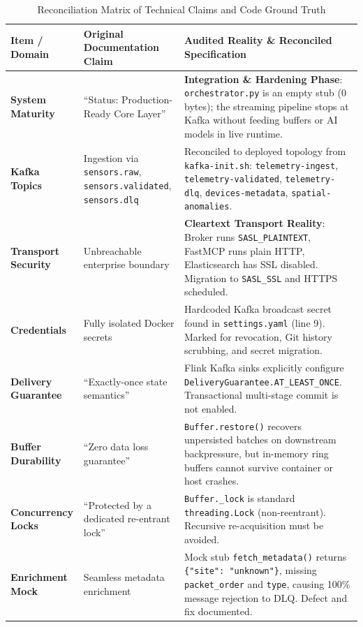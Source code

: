 \documentclass[10pt,a4paper]{report}
\begin{document}
\begin{table}[htbp]
\centering
\small
\caption{Reconciliation Matrix of Technical Claims and Code Ground Truth}
\label{tab:reconciliation_matrix}
\begin{tabularx}{\textwidth}{lXp{6.5cm}}
\toprule
\textbf{Item / Domain} & \textbf{Original Documentation Claim} & \textbf{Audited Reality \& Reconciled Specification} \\
\midrule
\textbf{System Maturity} & ``Status: Production-Ready Core Layer'' & \textbf{Integration \& Hardening Phase}: \texttt{orchestrator.py} is an empty stub (0 bytes); the streaming pipeline stops at Kafka without feeding buffers or AI models in live runtime. \\
\textbf{Kafka Topics} & Ingestion via \texttt{sensors.raw}, \texttt{sensors.validated}, \texttt{sensors.dlq} & Reconciled to deployed topology from \texttt{kafka-init.sh}: \texttt{telemetry-ingest}, \texttt{telemetry-validated}, \texttt{telemetry-dlq}, \texttt{devices-metadata}, \texttt{spatial-anomalies}. \\
\textbf{Transport Security} & Unbreachable enterprise boundary & \textbf{Cleartext Transport Reality}: Broker runs \texttt{SASL\_PLAINTEXT}, FastMCP runs plain HTTP, Elasticsearch has SSL disabled. Migration to \texttt{SASL\_SSL} and HTTPS scheduled. \\
\textbf{Credentials} & Fully isolated Docker secrets & Hardcoded Kafka broadcast secret found in \texttt{settings.yaml} (line 9). Marked for revocation, Git history scrubbing, and secret migration. \\
\textbf{Delivery Guarantee} & ``Exactly-once state semantics'' & Flink Kafka sinks explicitly configure \texttt{DeliveryGuarantee.AT\_LEAST\_ONCE}. Transactional multi-stage commit is not enabled. \\
\textbf{Buffer Durability} & ``Zero data loss guarantee'' & \texttt{Buffer.restore()} recovers unpersisted batches on downstream backpressure, but in-memory ring buffers cannot survive container or host crashes. \\
\textbf{Concurrency Locks} & ``Protected by a dedicated re-entrant lock'' & \texttt{Buffer.\_lock} is standard \texttt{threading.Lock} (non-reentrant). Recursive re-acquisition must be avoided. \\
\textbf{Enrichment Mock} & Seamless metadata enrichment & Mock stub \texttt{fetch\_metadata()} returns \texttt{\{"site": "unknown"\}}, missing \texttt{packet\_order} and \texttt{type}, causing 100\% message rejection to DLQ. Defect and fix documented. \\

\end{tabularx}
\end{table}
\end{document}
